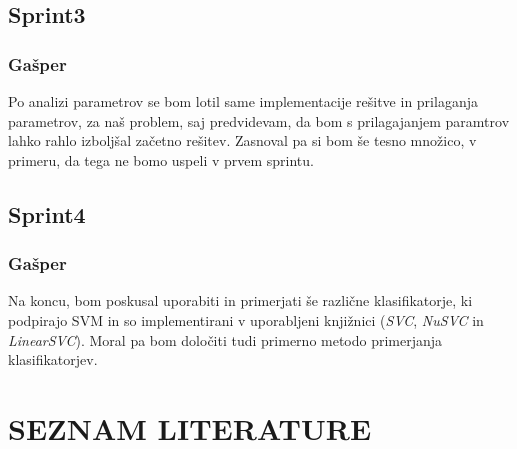 \documentclass[a4paper,11pt]{article}
\begin{document}
\subsection{Sprint3}
\subsubsection{Gašper}
Po analizi parametrov se bom lotil same implementacije rešitve in prilaganja parametrov, za naš problem, saj predvidevam, da bom s prilagajanjem paramtrov lahko rahlo izboljšal začetno rešitev. Zasnoval pa si bom še tesno množico, v primeru, da tega ne bomo uspeli v prvem sprintu.

\subsection{Sprint4}
\subsubsection{Gašper}
Na koncu, bom poskusal uporabiti in primerjati še različne klasifikatorje, ki podpirajo SVM in so implementirani v uporabljeni knjižnici (\textit{SVC}, \textit{NuSVC} in \textit{LinearSVC}). Moral pa bom določiti tudi primerno metodo primerjanja klasifikatorjev.

\newpage
\section{SEZNAM LITERATURE}{\baselineskip=-8pt}
\vspace{-36pt}
\renewcommand{\refname}{}
\nocite{*}

\end{document}
